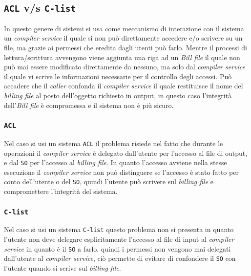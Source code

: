    \subsection{\texttt{ACL} v/s \texttt{C-list}}
        In questo genere di sistemi si usa come meccanismo di interazione con il sistema un \textit{compiler service} il quale si non può direttamente accedere e/o scrivere su un file, ma grazie ai permessi che eredita dagli utenti può farlo. Mentre il processi di lettura/scrittura avvengono viene aggiunta una riga ad un \textit{Bill file} il quale non può mai essere modificato direttamente da nessuno, ma solo dal \textit{compiler service} il quale vi scrive le informazioni necessarie per il controllo degli accessi.\newline
        Può accadere che il \textit{caller} confonda il \textit{compiler service} il quale restituisce il nome del \textit{billing file} al posto dell'oggetto richiesto in output, in questo caso l'integrità dell'\textit{Bill file} è compromessa e il sistema non è più sicuro.
        \subsubsection{\texttt{ACL}}
            Nel caso si usi un sistema \texttt{ACL} il problema risiede nel fatto che durante le operazioni il \textit{compiler service} è delegato dall'utente per l'accesso al file di output, e dal \texttt{SO} per l'accesso al \textit{billing file}. In quanto l'accesso avviene nella stesse esecuzione il \textit{compiler service} non può distinguere se l'accesso è stato fatto per conto dell'utente o del \texttt{SO}, quindi l'utente può scrivere sul \textit{billing file} e compromettere l'integrità del sistema.
        \subsubsection{\texttt{C-list}}
            Nel caso si usi un sistema \texttt{C-list} questo problema non si presenta in quanto l'utente non deve delegare esplicitamente l'accesso al file di input al \textit{compiler service} in quanto è il \texttt{SO} a farlo, quindi i permessi non vengono mai delegati dall'utente al \textit{compiler service}, ciò permette di evitare di confondere il \texttt{SO} con l'utente quando si scrive sul \textit{billing file}.
